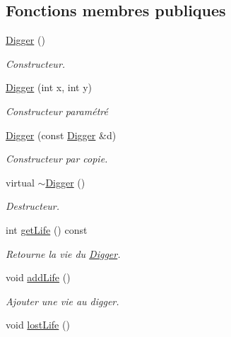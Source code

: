 \subsection*{Fonctions membres publiques}
\begin{DoxyCompactItemize}
\item 
\hyperlink{class_digger_ab712cca1629d630478971e1ebeae14ed}{Digger} ()
\begin{DoxyCompactList}\small\item\em Constructeur. \end{DoxyCompactList}\item 
\hyperlink{class_digger_abf3aff066cf3adacd0c449eb7e420e69}{Digger} (int x, int y)
\begin{DoxyCompactList}\small\item\em Constructeur paramétré \end{DoxyCompactList}\item 
\hyperlink{class_digger_a393843f6e9a11b36bb37fba78d5103e2}{Digger} (const \hyperlink{class_digger}{Digger} \&d)
\begin{DoxyCompactList}\small\item\em Constructeur par copie. \end{DoxyCompactList}\item 
virtual \hyperlink{class_digger_a5660a95d7f3d1bfe5c8a754b12e52652}{$\sim$\-Digger} ()
\begin{DoxyCompactList}\small\item\em Destructeur. \end{DoxyCompactList}\item 
int \hyperlink{class_digger_aa6ddf774365ef0913ad360fe23bd715f}{get\-Life} () const 
\begin{DoxyCompactList}\small\item\em Retourne la vie du \hyperlink{class_digger}{Digger}. \end{DoxyCompactList}\item 
\hypertarget{class_digger_a8319d8bb91288c95ea00463e010b3ea3}{void \hyperlink{class_digger_a8319d8bb91288c95ea00463e010b3ea3}{add\-Life} ()}\label{class_digger_a8319d8bb91288c95ea00463e010b3ea3}

\begin{DoxyCompactList}\small\item\em Ajouter une vie au digger. \end{DoxyCompactList}\item 
\hypertarget{class_digger_a802611cc330dfbcb53fecc27a46e6c19}{void \hyperlink{class_digger_a802611cc330dfbcb53fecc27a46e6c19}{lost\-Life} ()}\label{class_digger_a802611cc330dfbcb53fecc27a46e6c19}


\end{DoxyCompactItemize}
